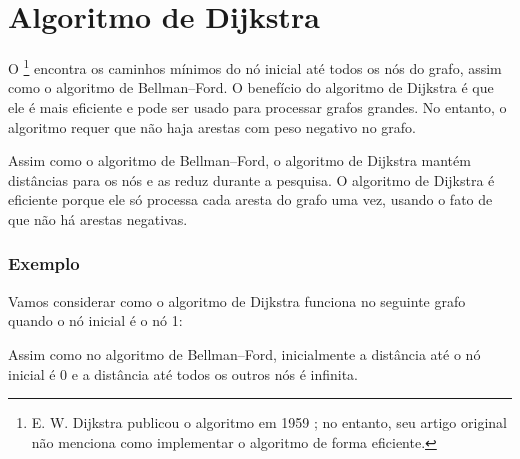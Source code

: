 \section{Algoritmo de Dijkstra}


O \footnote{E. W. Dijkstra publicou o algoritmo em 1959 \cite{dij59};
no entanto, seu artigo original não menciona como implementar o algoritmo de forma eficiente.}
encontra os caminhos mínimos
do nó inicial até todos os nós do grafo,
assim como o algoritmo de Bellman–Ford.
O benefício do algoritmo de Dijkstra é que
ele é mais eficiente e pode ser usado para
processar grafos grandes.
No entanto, o algoritmo requer que não
haja arestas com peso negativo no grafo.

Assim como o algoritmo de Bellman–Ford,
o algoritmo de Dijkstra mantém distâncias
para os nós e as reduz durante a pesquisa.
O algoritmo de Dijkstra é eficiente porque
ele só processa
cada aresta do grafo uma vez, usando o fato
de que não há arestas negativas.

\subsubsection{Exemplo}

Vamos considerar como o algoritmo de Dijkstra
funciona no seguinte grafo quando o
nó inicial é o nó 1:
\begin{center}
\end{center}
Assim como no algoritmo de Bellman–Ford,
inicialmente a distância até o nó inicial é 0
e a distância até todos os outros nós é infinita.

